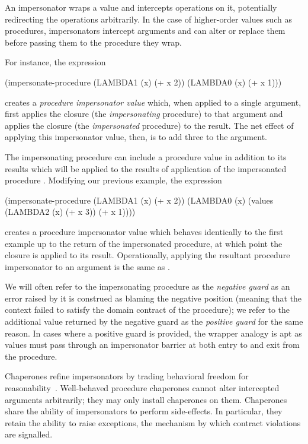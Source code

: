 \documentclass{sigplanconf}
\begin{document}
An impersonator wraps a value and intercepts operations on it, potentially redirecting the operations arbitrarily.
In the case of higher-order values such as procedures, impersonators intercept arguments and can alter or replace them before passing them to the procedure they wrap.

For instance, the expression
\begin{schemedisplay}
(impersonate-procedure (LAMBDA1 (x) (+ x 2)) (LAMBDA0 (x) (+ x 1)))
\end{schemedisplay}
creates a \emph{procedure impersonator value} which, when applied to a single argument, first applies the  closure (the \emph{impersonating} procedure) to that argument and applies the  closure (the \emph{impersonated} procedure) to the result.
The net effect of applying this impersonator value, then, is to add three to the argument.

The impersonating procedure  can include a procedure value in addition to its results which will be applied to the results of application of the impersonated procedure .
Modifying our previous example, the expression
\begin{schemedisplay}
(impersonate-procedure (LAMBDA1 (x) (+ x 2))
                       (LAMBDA0 (x) (values (LAMBDA2 (x) (+ x 3)) (+ x 1))))
\end{schemedisplay}
creates a procedure impersonator value which behaves identically to the first example up to the return of the impersonated procedure, at which point the  closure is applied to its result.
Operationally, applying the resultant procedure impersonator to an argument  is the same as .

We will often refer to the impersonating procedure as the \emph{negative guard} as an error raised by it is construed as blaming the negative position (meaning that the context failed to satisfy the domain contract of the procedure); we refer to the additional value returned by the negative guard as the \emph{positive guard} for the same reason.
In cases where a positive guard is provided, the wrapper analogy is apt as values must pass through an impersonator barrier at both entry to and exit from the procedure.

Chaperones refine impersonators by trading behavioral freedom for reasonability~\cite{strickland2012chaperones}.
Well-behaved procedure chaperones cannot alter intercepted arguments arbitrarily; they may only install chaperones on them.
Chaperones share the ability of impersonators to perform side-effects.
In particular, they retain the ability to raise exceptions, the mechanism by which contract violations are signalled.
\end{document}
